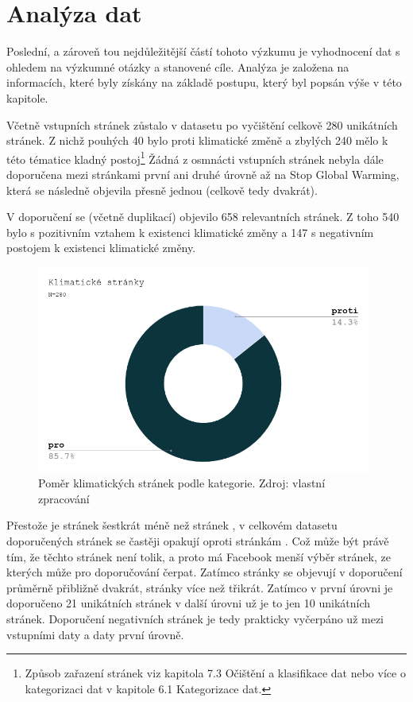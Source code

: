 \section{Analýza dat}
\label{sec:analyza-dat}
    Poslední, a zároveň tou nejdůležitější částí tohoto výzkumu je vyhodnocení dat s ohledem na výzkumné otázky a stanovené cíle. Analýza je založena na informacích, které byly získány na základě postupu, který byl popsán výše v této kapitole. 
    
    Včetně vstupních stránek zůstalo v datasetu po vyčištění celkově 280 unikát\-ních stránek. Z nichž pouhých 40 bylo proti klimatické změně a zbylých 240 mělo k této tématice kladný postoj\footnote{Způsob zařazení stránek viz kapitola 7.3 Očištění a klasifikace dat nebo více o kategorizaci dat v kapitole 6.1 Kategorizace dat.} Žádná z osmnácti vstupních stránek nebyla dále doporučena mezi stránkami první ani druhé úrovně až na Stop Global Warming, která se následně objevila přesně jednou (celkově tedy dvakrát). 
    
    V doporučení se (včetně duplikací) objevilo 658 relevantních stránek. Z toho 540 bylo s pozitivním vztahem k existenci klimatické změny a 147 s negativním postojem k existenci klimatické změny. 
    
    \begin{figure}[ht]
        \includegraphics[width=11cm]{obrazky/Klimatické stránky N=280.png}
        \centering
        \caption[Poměr klimatických stránek podle kategorie]{Poměr klimatických stránek podle kategorie. Zdroj: vlastní zpracování}
        \label{fig:fb-klima-stranky-kategorie}
    \end{figure}

    Přestože je stránek  šestkrát méně než stránek , v celkovém datasetu doporučených stránek se častěji opakují oproti stránkám . Což může být právě tím, že těchto stránek není tolik, a proto má Facebook menší výběr stránek, ze kterých může pro doporučování čerpat. Zatímco stránky  se objevují v doporučení průměrně přibližně dvakrát, stránky  více než třikrát. Zatímco v první úrovni je doporučeno 21 unikátních stránek  v další úrovni už je to jen 10 unikátních stránek. Doporučení negativních stránek je tedy prakticky vyčerpáno už mezi vstupními daty a daty první úrovně.  

